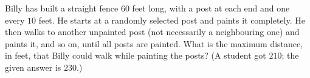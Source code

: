 Billy has built a straight fence $60$ feet long, with a post at each end and one every $10$ feet. He starts at a randomly selected post and paints it completely. He then walks to another unpainted post (not necessarily a neighbouring one) and paints it, and so on, until all posts are painted. What is the maximum distance, in feet, that Billy could walk while painting the posts? (A student got $210$; the given answer is $230$.)

